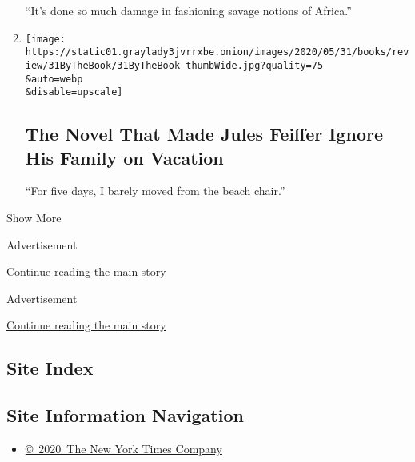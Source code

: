 \begin{enumerate}
  ``It's done so much damage in fashioning savage notions of Africa.''
\item
  \href{/2020/05/28/books/review/jules-feiffer-by-the-book-interview.html}{}

  \texttt{[image: https://static01.graylady3jvrrxbe.onion/images/2020/05/31/books/review/31ByTheBook/31ByTheBook-thumbWide.jpg?quality=75\\\&auto=webp\\\&disable=upscale]}

  \hypertarget{the-novel-that-made-jules-feiffer-ignore-his-family-on-vacation}{%
  \subsection{The Novel That Made Jules Feiffer Ignore His Family on
  Vacation}\label{the-novel-that-made-jules-feiffer-ignore-his-family-on-vacation}}

  ``For five days, I barely moved from the beach chair.''
\end{enumerate}

Show More

Advertisement

\protect\hyperlink{after-mid1}{Continue reading the main story}

Advertisement

\protect\hyperlink{after-mktg}{Continue reading the main story}

\hypertarget{site-index}{%
\subsection{Site Index}\label{site-index}}

\hypertarget{site-information-navigation}{%
\subsection{Site Information
Navigation}\label{site-information-navigation}}

\begin{itemize}
\tightlist
\item
  \href{https://help.nytimes3xbfgragh.onion/hc/en-us/articles/115014792127-Copyright-notice}{©~2020~The
  New York Times Company}
\end{itemize}


